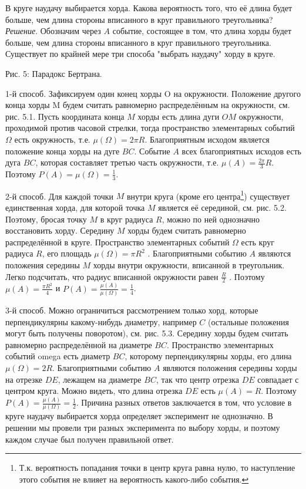 \begin{example}
	
В круге наудачу выбирается хорда. Какова вероятность того, что её длина будет больше, чем длина стороны вписанного в круг правильного треугольника?
\textit{Решение}. Обозначим через $A$ событие, состоящее в том, что длина хорды будет больше, чем длина стороны вписанного в круг правильного треугольника. Существует по крайней мере три способа "выбрать наудачу" хорду в
круге.

Рис. 5: Парадокс Бертрана.

1-й способ. Зафиксируем один конец хорды O на окружности. Положение другого конца хорды M будем считать равномерно распределённым на окружности, см. рис. 5.1. Пусть координата конца $M$ хорды есть длина дуги $OM$ окружности, проходимой против часовой стрелки, тогда пространство элементарных событий $\Omega$ есть окружность, т.е. $\mu(\Omega) = 2 \pi R$. Благоприятным
исходом является положение конца хорды на дуге $BC$. Событие $A$ всех благоприятных исходов есть дуга $BC$, которая составляет третью часть окружности, т.е. $\mu(A) = \frac{2 \pi}{3} R$. Поэтому $P(A) = \mu(\Omega) = \frac{1}{3}$.

2-й способ. Для каждой точки $M$ внутри круга (кроме его центра\footnote{
	Т.к. вероятность попадания точки в центр круга равна нулю, то наступление этого события не влияет
на вероятность какого-либо события.
}) 
существует единственная хорда, для которой точка $M$ является её серединой, см. рис. 5.2. Поэтому, бросая точку $M$ в круг радиуса $R$, можно по ней однозначно восстановить хорду. Середину $M$ хорды будем считать равномерно распределённой в круге. Пространство элементарных событий $\Omega$ есть круг
радиуса $R$, его площадь $\mu(\Omega) = \pi R^2$ . Благоприятными событию $A$ являются положения середины $M$ хорды внутри окружности, вписанной в треугольник. Легко подсчитать, что радиус вписанной окружности равен $\frac{R}{2}$ . Поэтому $\mu(A) = \frac{\pi R^2}{4}$ и $P(A) = \frac{\mu(A)}{\mu(\Omega)} = \frac{1}{4}$.

3-й способ. Можно ограничиться рассмотрением только хорд, которые перпендикулярны какому-нибудь диаметру, например $C$ (остальные положения могут быть получены поворотом), см. рис. 5.3. Середину хорды будем считать равномерно распределённой на диаметре $BC$. Пространство элементарных событий omega есть диаметр $BC$, которому перпендикулярны хорды, его длина $\mu(\Omega) = 2R$. Благоприятными событию $A$ являются положения середины хорды на отрезке $DE$, лежащем на диаметре $BC$, так что центр отрезка $DE$ совпадает с центром круга. Можно видеть, что длина отрезка $DE$ есть $\mu(A) = R$. Поэтому $P(A) = \frac{\mu(A)}{\mu(\Omega)} = \frac{1}{2}$.
Причина разных ответов заключается в том, что условие в круге наудачу выбирается хорда определяет эксперимент не однозначно. В решении мы провели три разных эксперимента по выбору хорды, и поэтому каждом случае был получен правильной ответ.

\end{example}

% 